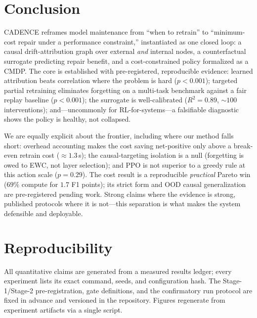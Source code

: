 \documentclass[conference]{IEEEtran}
\begin{document}
\section{Conclusion}\label{sec:conclusion}
CADENCE reframes model maintenance from ``when to retrain'' to
``minimum-cost repair under a performance constraint,'' instantiated as one
closed loop: a causal drift-attribution graph over external \emph{and}
internal nodes, a counterfactual surrogate predicting repair benefit, and a
cost-constrained policy formalized as a CMDP. The core is established with
pre-registered, reproducible evidence: learned attribution beats correlation
where the problem is hard ($p<0.001$); targeted partial retraining
eliminates forgetting on a multi-task benchmark against a fair replay
baseline ($p<0.001$); the surrogate is well-calibrated ($R^2=0.89$,
$\sim\!100$ interventions); and---uncommonly for RL-for-systems---a
falsifiable diagnostic shows the policy is healthy, not collapsed.

We are equally explicit about the frontier, including where our method falls
short: overhead accounting makes the cost saving net-positive only above a
break-even retrain cost ($\approx1.3$\,s); the causal-targeting isolation is
a null (forgetting is owed to EWC, not layer selection); and PPO is not
superior to a greedy rule at this action scale ($p=0.29$). The cost result
is a reproducible \emph{practical} Pareto win ($69\%$ compute for $1.7$ F1
points); its strict form and OOD causal generalization are pre-registered
pending work. Strong claims where the evidence is strong, published
protocols where it is not---this separation is what makes the system
defensible and deployable.

\section*{Reproducibility}
All quantitative claims are generated from a measured results ledger; every
experiment lists its exact command, seeds, and configuration hash. The
Stage-1/Stage-2 pre-registration, gate definitions, and the confirmatory
run protocol are fixed in advance and versioned in the repository. Figures
regenerate from experiment artifacts via a single script.



\end{document}
